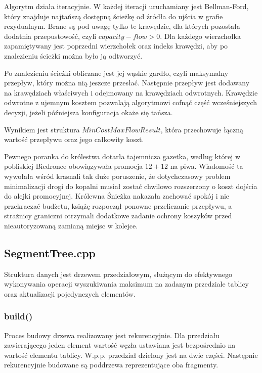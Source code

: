 \documentclass{article}
\begin{document}
Algorytm działa iteracyjnie. W każdej iteracji uruchamiany jest Bellman-Ford, który znajduje najtańszą dostępną ścieżkę od źródła do ujścia w grafie rezydualnym. Brane są pod uwagę tylko te krawędzie, dla których pozostała dodatnia przepustowość, czyli $capacity - flow > 0$. Dla każdego wierzchołka zapamiętywany jest poprzedni wierzchołek oraz indeks krawędzi, aby po znalezieniu ścieżki można było ją odtworzyć.

Po znalezieniu ścieżki obliczane jest jej wąskie gardło, czyli maksymalny przepływ, który można nią jeszcze przesłać. Następnie przepływ jest dodawany na krawędziach właściwych i odejmowany na krawędziach odwrotnych. Krawędzie odwrotne z ujemnym kosztem pozwalają algorytmowi cofnąć część wcześniejszych decyzji, jeżeli późniejsza konfiguracja okaże się tańsza.

Wynikiem jest struktura $MinCostMaxFlowResult$, która przechowuje łączną wartość przepływu oraz jego całkowity koszt.


{\scriptsize Pewnego poranka do królestwa dotarła tajemnicza gazetka, według której w pobliskiej Biedronce obowiązywała promocja $12 + 12$ na piwa. Wiadomość ta wywołała wśród krasnali tak duże poruszenie, że dotychczasowy problem minimalizacji drogi do kopalni musiał zostać chwilowo rozszerzony o koszt dojścia do alejki promocyjnej. Królewna Śnieżka nakazała zachować spokój i nie przekraczać budżetu, książę rozpoczął ponowne przeliczanie przepływu, a strażnicy graniczni otrzymali dodatkowe zadanie ochrony koszyków przed nieautoryzowaną zamianą miejsc w kolejce.\par}




\subsection{SegmentTree.cpp}
Struktura danych jest drzewem przedziałowym, służącym do efektywnego wykonywania operacji wyszukiwania maksimum na zadanym przedziale tablicy oraz aktualizacji pojedynczych elementów.
\subsubsection{build()}
Proces budowy drzewa realizowany jest rekurencyjnie. Dla przedziału zawierającego jeden element wartość węzła ustawiana jest bezpośrednio na wartość elementu tablicy. W.p.p. przedział dzielony jest na dwie części. Następnie rekurencyjnie budowane są poddrzewa reprezentujące oba fragmenty.
\end{document}
